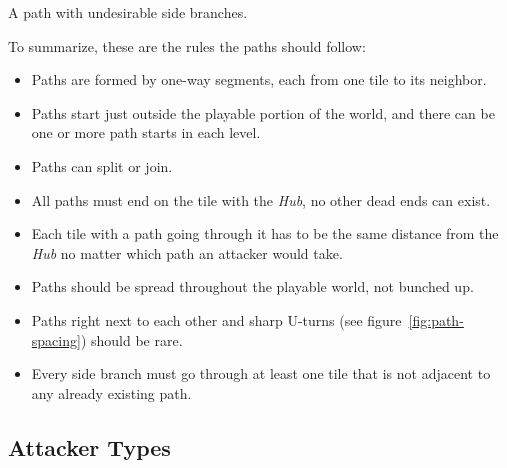 \begin{center}
    \captionsetup{type=figure}
    \caption{A path with undesirable side branches.}
    \label{fig:bad-path-splits}
\end{center}

To summarize, these are the rules the paths should follow:
\begin{itemize}
    \item Paths are formed by one-way segments, each from one tile to its neighbor.
    \item Paths start just outside the playable portion of the world, and there can be one or more path starts in each level.
    \item Paths can split or join.
    \item All paths must end on the tile with the \emph{Hub}, no other dead ends can exist.
    \item Each tile with a path going through it has to be the same distance from the \emph{Hub} no matter which path an attacker would take.
    \item Paths should be spread throughout the playable world, not bunched up.
    \item Paths right next to each other and sharp U-turns (see figure~\ref{fig:path-spacing}) should be rare.
    \item Every side branch must go through at least one tile that is not adjacent to any already existing path.
\end{itemize}

\subsection{Attacker Types}\label{sec:attacker-types}

